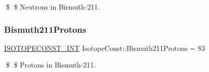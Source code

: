 \$ \$ Neutrons in Bismuth-\/211. \mbox{\label{group___isotope_const-_bismuth-_bi211_gad62ffeac20ad32a38d900b40eedc2ebe}} 
\subsubsection{\texorpdfstring{Bismuth211\+Protons}{Bismuth211Protons}}
{\footnotesize\ttfamily \mbox{\hyperlink{group___isotope_const-_macros_ga5f18360b3e99483a35c32d789e62621c}{I\+S\+O\+T\+O\+P\+E\+C\+O\+N\+S\+T\+\_\+\+I\+NT}} Isotope\+Const\+::\+Bismuth211\+Protons = 83}

\$ \$ Protons in Bismuth-\/211. 